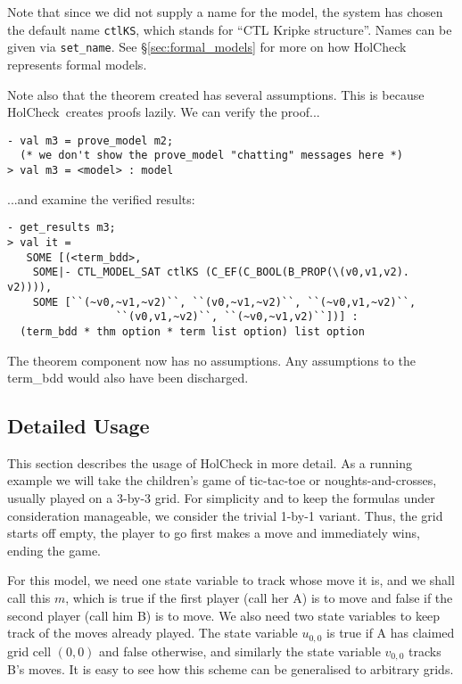 \documentclass[12pt,fleqn]{article}
\newcommand{\hc}{HolCheck}
\begin{document}
Note that since we did not supply a name for the model, the system has chosen the default name \texttt{ctlKS}, which stands for ``CTL Kripke structure''. Names can be given via \texttt{set\_name}. See \S\ref{sec:formal_models} for more on how \hc{} represents formal models.

Note also that the theorem created has several assumptions. This is because \hc{}\, creates proofs lazily. We can verify the proof...
\begin{session}\begin{verbatim}
- val m3 = prove_model m2;
  (* we don't show the prove_model "chatting" messages here *)
> val m3 = <model> : model\end{verbatim}\end{session}
...and examine the verified results:
\begin{session}\begin{verbatim}
- get_results m3;
> val it =
   SOME [(<term_bdd>,
    SOME|- CTL_MODEL_SAT ctlKS (C_EF(C_BOOL(B_PROP(\(v0,v1,v2). v2)))),
    SOME [``(~v0,~v1,~v2)``, ``(v0,~v1,~v2)``, ``(~v0,v1,~v2)``,
                 ``(v0,v1,~v2)``, ``(~v0,~v1,v2)``])] :
  (term_bdd * thm option * term list option) list option
\end{verbatim}\end{session}
The theorem component now has no assumptions. Any assumptions to the term\_bdd would also have been discharged.

\subsection{Detailed Usage}

This section describes the usage of \hc{} in more detail. As a running example we will take the children's game of tic-tac-toe or noughts-and-crosses, usually played on a 3-by-3 grid. For simplicity and to keep the formulas under consideration manageable, we consider the trivial 1-by-1 variant. Thus, the grid starts off empty, the player to go first makes a move and immediately wins, ending the game.

For this model, we need one state variable to track whose move it is, and we shall call this \(m\), which is true if the first player (call her A) is to move and false if the second player (call him B) is to move. We also need two state variables to keep track of the moves already played. The state variable \(u_{0,0}\) is true if A has claimed grid cell \((0,0)\) and false otherwise, and similarly the state variable \(v_{0,0}\) tracks B's moves. It is easy to see how this scheme can be generalised to arbitrary grids.
\end{document}
